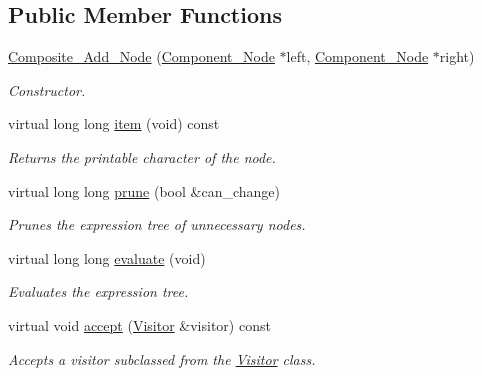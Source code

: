 \subsection*{Public Member Functions}
\begin{DoxyCompactItemize}
\item 
\hyperlink{classMadara_1_1Expression__Tree_1_1Composite__Add__Node_af67f8eef6f9b7feb2cfb655b1a8a48e2}{Composite\_\-Add\_\-Node} (\hyperlink{classMadara_1_1Expression__Tree_1_1Component__Node}{Component\_\-Node} $\ast$left, \hyperlink{classMadara_1_1Expression__Tree_1_1Component__Node}{Component\_\-Node} $\ast$right)
\begin{DoxyCompactList}\small\item\em Constructor. \item\end{DoxyCompactList}\item 
virtual long long \hyperlink{classMadara_1_1Expression__Tree_1_1Composite__Add__Node_a04d546052a4d35dae43c90441ffb5848}{item} (void) const 
\begin{DoxyCompactList}\small\item\em Returns the printable character of the node. \item\end{DoxyCompactList}\item 
virtual long long \hyperlink{classMadara_1_1Expression__Tree_1_1Composite__Add__Node_a40ec621d31e38a5fdefa7445e5378227}{prune} (bool \&can\_\-change)
\begin{DoxyCompactList}\small\item\em Prunes the expression tree of unnecessary nodes. \item\end{DoxyCompactList}\item 
virtual long long \hyperlink{classMadara_1_1Expression__Tree_1_1Composite__Add__Node_ac1e44d1f7c126c83d989c4ab5bc4cef1}{evaluate} (void)
\begin{DoxyCompactList}\small\item\em Evaluates the expression tree. \item\end{DoxyCompactList}\item 
virtual void \hyperlink{classMadara_1_1Expression__Tree_1_1Composite__Add__Node_af0f45a8cfcb75f6c1d05bb0e955def10}{accept} (\hyperlink{classMadara_1_1Expression__Tree_1_1Visitor}{Visitor} \&visitor) const 
\begin{DoxyCompactList}\small\item\em Accepts a visitor subclassed from the \hyperlink{classMadara_1_1Expression__Tree_1_1Visitor}{Visitor} class. \item\end{DoxyCompactList}\item 

\end{DoxyCompactItemize}
